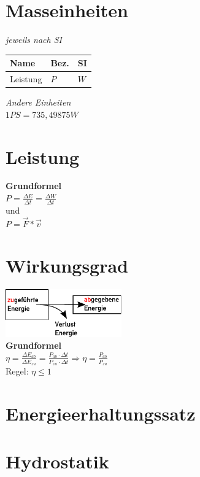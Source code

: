 \documentclass[a4paper,10pt]{article}
\begin{document}
\begin{multicols}{3}

  \section{Masseinheiten}
  \textit{jeweils nach SI}\\
  \begin{tabular}{|l|l|l|}
    \hline
    \textbf{Name} & \textbf{Bez.} & \textbf{SI} \\\hline
    Leistung & \(P\) & \(W\)\\\hline
  \end{tabular}

  \textit{Andere Einheiten}\\
  \(1 PS = 735,49875 W\)\\


  \section{Leistung}
  \textbf{Grundformel}\\
  \(P = \frac{\Delta E}{\Delta t} = \frac{\Delta W}{\Delta t} \)\\
  und\\
  \(P = \vec{F} * \vec{v}\)

  \section{Wirkungsgrad}
  \includegraphics[width=5cm]{wirkungsgrad}\\
  \textbf{Grundformel}\\
  \(\eta = \frac{{\Delta {E_{ab}}}}{{\Delta {E_{zu}}}} = \frac{{{P_{ab}} \cdot \Delta t}}{{{P_{zu}} \cdot \Delta t}} \Rightarrow \eta = \frac{{{P_{ab}}}}{{{P_{zu}}}}\)
  \\
  Regel: \(\eta \leq 1\)
  \section{Energieerhaltungssatz}

  \section{Hydrostatik}

\end{multicols}
\end{document}
